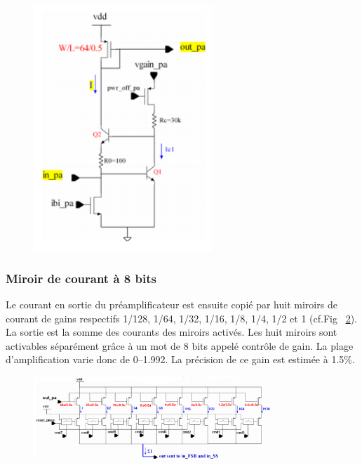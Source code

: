 \begin{figure}[th!]
	\centering
	\includegraphics[width=0.60\textwidth]{GLA/preampli.png}
	\label{preampli}
\end{figure}

\subsubsection{Miroir de courant à 8 bits}
Le courant en sortie du préamplificateur est ensuite copié par huit miroirs de courant de gains respectifs 1/128, 1/64, 1/32, 1/16, 1/8, 1/4, 1/2 et 1 (cf.Fig~ \ref{mirror}). La sortie est la somme des courants des miroirs activés. Les huit miroirs sont activables séparément grâce à un mot de \num{8} bits appelé contrôle de gain. La plage d'amplification varie donc de \SIrange{0}{1.992}{}. La précision de ce gain est estimée à 1.5\%. 

\begin{figure}[ht!]
	\centering
	\includegraphics[width=0.8\textwidth]{GLA/miror.png}
	\label{mirror}
\end{figure}

